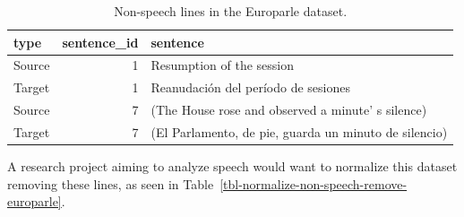 \documentclass[
  letterpaper,
]{latex/krantz}
\begin{document}
\hypertarget{tbl-normalize-non-speech-identify-europarle}{}
\begin{table}
\caption{\label{tbl-normalize-non-speech-identify-europarle}Non-speech lines in the Europarle dataset. }\tabularnewline

\centering
\begin{tabular}{lrl}
\toprule
type & sentence\_id & sentence\\
\midrule
Source & 1 & Resumption of the session\\
Target & 1 & Reanudación del período de sesiones\\
Source & 7 & (The House rose and observed a minute' s silence)\\
Target & 7 & (El Parlamento, de pie, guarda un minuto de silencio)\\
\bottomrule
\end{tabular}
\end{table}

A research project aiming to analyze speech would want to normalize this
dataset removing these lines, as seen in
Table~\ref{tbl-normalize-non-speech-remove-europarle}.
\end{document}
